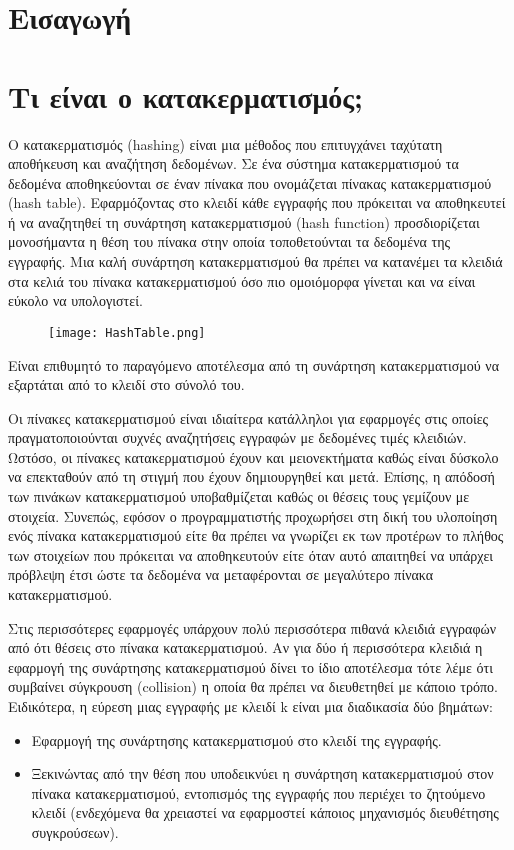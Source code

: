 \section{Εισαγωγή}

\section{Τι είναι ο κατακερματισμός;}
Ο κατακερματισμός (hashing) είναι μια μέθοδος που επιτυγχάνει ταχύτατη αποθήκευση και αναζήτηση δεδομένων. Σε ένα σύστημα κατακερματισμού τα δεδομένα αποθηκεύονται σε έναν πίνακα που ονομάζεται πίνακας κατακερματισμού (hash table). Εφαρμόζοντας στο κλειδί κάθε εγγραφής που πρόκειται να αποθηκευτεί ή να αναζητηθεί τη συνάρτηση κατακερματισμού (hash function) προσδιορίζεται μονοσήμαντα η θέση του πίνακα στην οποία τοποθετούνται τα δεδομένα της εγγραφής.
Μια καλή συνάρτηση κατακερματισμού θα πρέπει να κατανέμει τα κλειδιά στα κελιά του πίνακα κατακερματισμού όσο πιο ομοιόμορφα γίνεται και να είναι εύκολο να υπολογιστεί.

\begin{figure}[h]
\centering
\texttt{[image: HashTable.png]}
\caption{}
\label{fig:hashtable1}
\end{figure}

Είναι επιθυμητό το παραγόμενο αποτέλεσμα από τη συνάρτηση κατακερματισμού να εξαρτάται από το κλειδί στο σύνολό του.

Οι πίνακες κατακερματισμού είναι ιδιαίτερα κατάλληλοι για εφαρμογές στις οποίες πραγματοποιούνται συχνές αναζητήσεις εγγραφών με δεδομένες τιμές κλειδιών. Ωστόσο, οι πίνακες κατακερματισμού έχουν και μειονεκτήματα καθώς είναι δύσκολο να επεκταθούν από τη στιγμή που έχουν δημιουργηθεί και μετά. Επίσης, η απόδοσή των πινάκων κατακερματισμού υποβαθμίζεται καθώς οι θέσεις τους γεμίζουν με στοιχεία. Συνεπώς, εφόσον ο προγραμματιστής προχωρήσει στη δική του υλοποίηση ενός πίνακα κατακερματισμού είτε θα πρέπει να γνωρίζει εκ των προτέρων το πλήθος των στοιχείων που πρόκειται να αποθηκευτούν είτε όταν αυτό απαιτηθεί να υπάρχει πρόβλεψη έτσι ώστε τα δεδομένα να μεταφέρονται σε μεγαλύτερο πίνακα κατακερματισμού.

Στις περισσότερες εφαρμογές υπάρχουν πολύ περισσότερα πιθανά κλειδιά εγγραφών από ότι θέσεις στο πίνακα κατακερματισμού. Αν για δύο ή περισσότερα κλειδιά η εφαρμογή της συνάρτησης κατακερματισμού δίνει το ίδιο αποτέλεσμα τότε λέμε ότι συμβαίνει σύγκρουση (collision) η οποία θα πρέπει να διευθετηθεί με κάποιο τρόπο. Ειδικότερα, η εύρεση μιας εγγραφής με κλειδί k είναι μια διαδικασία δύο βημάτων:
\begin{itemize}[noitemsep]
\item Εφαρμογή της συνάρτησης κατακερματισμού στο κλειδί της εγγραφής.
\item Ξεκινώντας από την θέση που υποδεικνύει η συνάρτηση κατακερματισμού στον πίνακα κατακερματισμού, εντοπισμός της εγγραφής που περιέχει το ζητούμενο κλειδί (ενδεχόμενα θα χρειαστεί να εφαρμοστεί κάποιος μηχανισμός διευθέτησης συγκρούσεων). 
\end{itemize}

